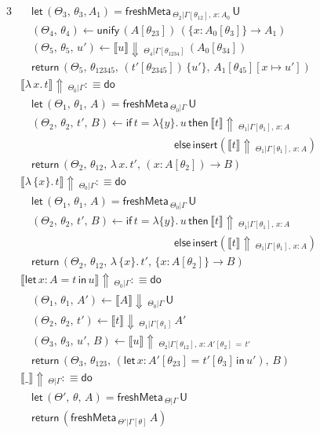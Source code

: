\documentclass[acmsmall,review,anonymous,prologue,dvipsnames]{acmart}\settopmatter{printfolios=true,printccs=false,printacmref=false}
\newcommand{\slet}{\boldsymbol{\mathsf{let}}}
\renewcommand{\sin}{\boldsymbol{\mathsf{in}}}
\renewcommand{\U}{\mathsf{U}}
\newcommand{\freshMeta}[3]{\mathsf{freshMeta}\,_{#1|#2}\,#3}
\newcommand{\unify}{\mathsf{unify}}
\newcommand{\echeck}[4]{\llbracket#1\rrbracket\!\Downarrow\,_{#2|#3}\,#4}
\newcommand{\einfer}[3]{\llbracket#1\rrbracket\!\Uparrow\,_{#2|#3}}
\newcommand{\edo}{\boldsymbol{\mathsf{do}}}
\newcommand{\ereturn}{\boldsymbol{\mathsf{return}}}
\newcommand{\eif}{\boldsymbol{\mathsf{if}}}
\newcommand{\ethen}{\boldsymbol{\mathsf{then}}}
\newcommand{\eelse}{\boldsymbol{\mathsf{else}}}
\newcommand{\einsert}{\mathsf{insert}}
\theoremstyle{remark}
\begin{document}
\begin{alignat*}{3}
  &\quad \slet\,(\Theta_3,\,\theta_3,A_1) = \freshMeta{\Theta_2}{\Gamma[\theta_{12}],\,x:A_0}{\U}\\
  &\quad (\Theta_4,\,\theta_4) \leftarrow \unify\,(A[\theta_{23}])\,(\{x : A_0[\theta_3]\}\to A_1)\\
  &\quad (\Theta_5,\,\theta_5,\,u') \leftarrow \echeck{u}{\Theta_4}{\Gamma[\theta_{1234}]}{(A_0[\theta_{34}])}\\
                 &\quad \ereturn\,(\Theta_5,\,\theta_{12345},\,(t'[\theta_{2345}])\,\{u'\},\,A_1[\theta_{45}][x\mapsto u'])\\
  &\einfer{\lambda\,x.\,t}{\Theta_0}{\Gamma} :\equiv \edo \\
  &\quad \slet\, (\Theta_1,\,\theta_1,\,A) = \freshMeta{\Theta_0}{\Gamma}{\U}\\
  &\quad(\Theta_2,\,\theta_2,\,t',\,B)\leftarrow \eif\,t = \lambda\{y\}.\,u\,\ethen\,\einfer{t}{\Theta_1}{\Gamma[\theta_1],\,x:A}\\
  &\quad\quad\hspace{12em} \eelse\,\einsert(\einfer{t}{\Theta_1}{\Gamma[\theta_1],\,x:A}) \\
  &\quad\ereturn\,(\Theta_2,\,\theta_{12},\,\lambda\,x.\,t',\,(x : A[\theta_2])\to B)\\
  &\einfer{\lambda\,\{x\}.\,t}{\Theta_0}{\Gamma} :\equiv \edo \\
  &\quad \slet\,(\Theta_1,\,\theta_1,\,A) = \freshMeta{\Theta_0}{\Gamma}{\U}\\
  &\quad(\Theta_2,\,\theta_2,\,t',\,B)\leftarrow \eif\,t = \lambda\{y\}.\,u\,\ethen\,\einfer{t}{\Theta_1}{\Gamma[\theta_1],\,x:A}\\
  &\quad\quad\hspace{12em} \eelse\,\einsert(\einfer{t}{\Theta_1}{\Gamma[\theta_1],\,x:A}) \\
  &\quad\ereturn\,(\Theta_2,\,\theta_{12},\,\lambda\,\{x\}.\,t',\,\{x : A[\theta_2]\}\to B)\\
  &\einfer{\slet\,x:A=t\,\sin\,u}{\Theta_0}{\Gamma} :\equiv \edo \\
  &\quad(\Theta_1,\,\theta_1,\,A') \leftarrow \echeck{A}{\Theta_0}{\Gamma}{\U}\\
  &\quad(\Theta_2,\,\theta_2,\,t') \leftarrow \echeck{t}
                {\Theta_1}{\Gamma[\theta_1]}{A'}\\
  &\quad(\Theta_3,\,\theta_3,\,u',\,B) \leftarrow
                \einfer{u}{\Theta_2}{\Gamma[\theta_{12}],\,x:A'[\theta_2]\,=\,t'}\\
  &\quad\ereturn\,(\Theta_3,\,\theta_{123},\,(\slet\,x:A'[\theta_{23}]=t'[\theta_3]\,\sin\,u'),\,B)\\
  &\einfer{\_}{\Theta}{\Gamma} :\equiv \edo \\
  &\quad \slet\,(\Theta',\,\theta,\,A) = \freshMeta{\Theta}{\Gamma}{\U}\\
  &\quad \ereturn\,(\freshMeta{\Theta'}{\Gamma[\theta]}{A})\\
\end{alignat*}
\endgroup
\end{document}
